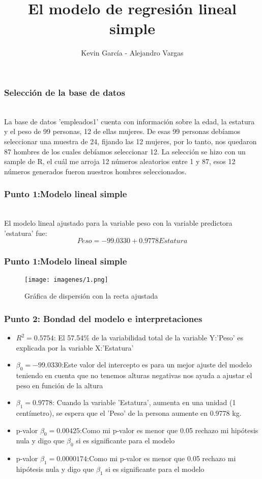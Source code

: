 \documentclass[12pt]{beamer}
\author{Kevin García - Alejandro Vargas}
\title{El modelo de regresión lineal simple}
\begin{document}
\begin{frame}
\titlepage
\end{frame}

\begin{frame}
\frametitle{Selección de la base de datos}
~\\La base de datos 'empleados1' cuenta con información sobre la edad, la estatura y el peso
de 99 personas, 12 de ellas mujeres. De esas 99 personas debíamos seleccionar una muestra de 24, fijando las 12 mujeres, por lo tanto, nos quedaron 87 hombres de los cuales debíamos seleccionar 12. La selección se hizo con un sample de R, el cuál me arroja 12 números aleatorios entre 1 y 87, esos 12 números generados fueron nuestros hombres seleccionados.
\end{frame}

\begin{frame}
\frametitle{Punto 1:Modelo lineal simple}
~\\ El modelo lineal ajustado para la variable peso con la variable predictora 'estatura' fue:
~\\ $$Peso=-99.0330+0.9778 Estatura$$
\end{frame}
\begin{frame}
\frametitle{Punto 1:Modelo lineal simple}
\begin{figure}[!h]
    \begin{center}
        \texttt{[image: imagenes/1.png]}
        \caption{Gráfica de dispersión con la recta ajustada}
        \label{fig:Densidad}
    \end{center}
\end{figure}
\end{frame}

\begin{frame}
\frametitle{Punto 2: Bondad del modelo e interpretaciones}
\begin{itemize}
\item $R^2=0.5754$: El 57.54\% de la variabilidad total de la variable Y:'Peso' es explicada por la variable X:'Estatura'
\item $\beta_{0}=-99.0330$:Este valor del intercepto es para un mejor ajuste del modelo teniendo en cuenta que no tenemos alturas negativas nos ayuda a ajustar el peso en función de la altura
\item $\beta_{1}=0.9778$: Cuando la variable 'Estatura', aumenta en una unidad (1 centímetro), se espera que el 'Peso' de la persona aumente en 0.9778 kg.
\item p-valor $\beta_{0}=0.00425$:Como mi p-valor es menor que 0.05 rechazo mi hipótesis nula y digo que $\beta_{0}$ si es significante para el modelo 
\item p-valor $\beta_{1}=0.0000174$:Como mi p-valor es menor que 0.05 rechazo mi hipótesis nula y digo que $\beta_{1}$ si es significante para el modelo
\end{itemize}
\end{frame}
\end{document}
